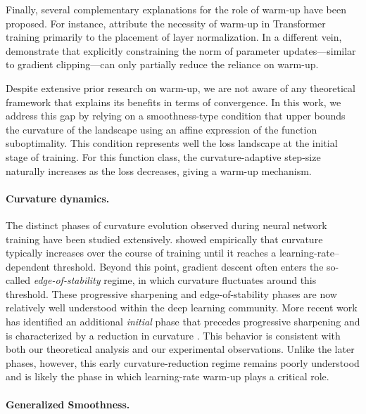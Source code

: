 \documentclass[a4paper,11pt]{article}
\newcommand{\1}{\mathbbm{1}}
\theoremstyle{plain}
\begin{document}
Finally, several complementary explanations for the role of warm-up have been proposed. For instance, \citet{xiong2020layer} attribute the necessity of warm-up in Transformer training primarily to the placement of layer normalization. In a different vein, \citet{kosson2024analyzing} demonstrate that explicitly constraining the norm of parameter updates—similar to gradient clipping—can only partially reduce the reliance on warm-up.

Despite extensive prior research on warm-up, we are not aware of any theoretical framework that explains its benefits in terms of convergence. In this work, we address this gap by relying on a smoothness-type condition that upper bounds the curvature of the landscape using an affine expression of the function suboptimality. This condition represents well the loss landscape at the initial stage of training. For this function class, the curvature-adaptive step-size naturally increases as the loss decreases, giving a warm-up mechanism.

\paragraph{Curvature dynamics.}

The distinct phases of curvature evolution observed during neural network training have been studied extensively. \citet{cohen2021gradient} showed empirically that curvature typically increases over the course of training until it reaches a learning-rate--dependent threshold. Beyond this point, gradient descent often enters the so-called \emph{edge-of-stability} regime, in which curvature fluctuates around this threshold. These progressive sharpening and edge-of-stability phases are now relatively well understood within the deep learning community. More recent work has identified an additional \emph{initial} phase that precedes progressive sharpening and is characterized by a reduction in curvature \citep{kalra2023universal,kalra2024warmup}. This behavior is consistent with both our theoretical analysis and our experimental observations. Unlike the later phases, however, this early curvature-reduction regime remains poorly understood and is likely the phase in which learning-rate warm-up plays a critical role.







\paragraph{Generalized Smoothness.}
\end{document}
